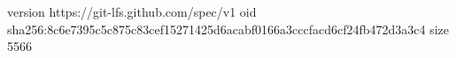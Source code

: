 version https://git-lfs.github.com/spec/v1
oid sha256:8c6e7395c5c875c83cef15271425d6acabf0166a3cccfacd6cf24fb472d3a3c4
size 5566
